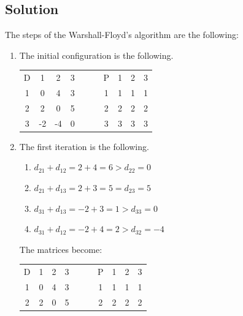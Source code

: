 \documentclass[12pt, a4paper]{report}
\newtheorem[style=M,bodystyle=\normalfont]{theorem}{Theorem}
\newtheorem[style=M,bodystyle=\normalfont]{corollary}{Corollary}
\newtheorem[style=M,bodystyle=\normalfont]{lemma}{Lemma}
\newtheorem[style=M,bodystyle=\normalfont]{definition}{Definition}
\begin{document}
    \subsection*{Solution}
        The steps of the Warshall-Floyd's algorithm are the following:
        \begin{enumerate}
            \item The initial configuration is the following. 
                \begin{table}[H]
                    \centering
                    \begin{tabular}{c|ccccc|ccc}
                    D & 1        & 2        & 3          & $\:\:\:\:\:\:$ & P & 1 & 2 & 3  \\ \cline{1-4} \cline{6-9} 
                    1 & 0        & 4        & 3          &                & 1 & 1 & 1 & 1  \\
                    2 & 2        & 0        & 5          &                & 2 & 2 & 2 & 2  \\
                    3 & -2       & -4       & 0          &                & 3 & 3 & 3 & 3  \\ 
                    \end{tabular}
                \end{table}
            \item The first iteration is the following. 
                \begin{enumerate}
                    \item $d_{21} + d_{12} = 2 + 4 = 6 > d_{22} = 0$
                    \item $d_{21} + d_{13} = 2 + 3 = 5 = d_{23} = 5$
                    \item $d_{31} + d_{13} = -2 + 3 = 1 > d_{33} = 0$
                    \item $d_{31} + d_{12} = -2 + 4 = 2 > d_{32} = -4$
                \end{enumerate}
                The matrices become: 
                \begin{table}[H]
                    \centering
                    \begin{tabular}{c|ccccc|ccc}
                    D & 1        & 2        & 3          & $\:\:\:\:\:\:$ & P & 1 & 2 & 3  \\ \cline{1-4} \cline{6-9} 
                    1 & 0        & 4        & 3          &                & 1 & 1 & 1 & 1  \\
                    2 & 2        & 0        & 5          &                & 2 & 2 & 2 & 2  \\

\end{tabular}
\end{table}
\end{enumerate}
\end{document}
